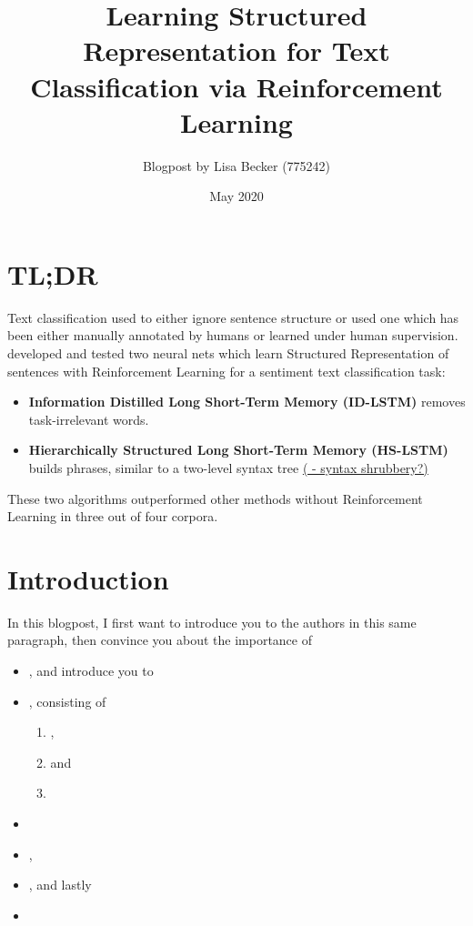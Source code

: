 \documentclass{article}
\title{Learning Structured Representation for Text Classification via Reinforcement Learning}
\author{Blogpost by Lisa Becker (775242) }
\date{May 2020}
\begin{document}
\maketitle

\section{TL;DR}
Text classification used to either ignore sentence structure or used one which has been either manually annotated by humans or learned under human supervision. \cite{zhang2018} developed and tested two neural nets which learn Structured Representation of sentences with Reinforcement Learning for a sentiment text classification task:
\begin{itemize}
    \item \textbf{Information Distilled Long Short-Term Memory (ID-LSTM)} removes task-irrelevant words.
    \item \textbf{Hierarchically Structured Long Short-Term Memory (HS-LSTM)} builds phrases, similar to a two-level syntax tree \href{https://www.youtube.com/watch?v=69iB-xy0u4A}{( - syntax shrubbery?)}
\end{itemize}
These two algorithms outperformed other methods without Reinforcement Learning in three out of four corpora.
\section{Introduction}
In this blogpost, I first want to introduce you to the authors in this same paragraph, then convince you about the importance of
\begin{itemize}
    \item {}, and introduce you to
    \item {}, consisting of
    \begin{enumerate}
        \item \textbf{},
        \item \textbf{} and
        \item \textbf{}
    \end{enumerate}
    \item {}
    \item {},
    \item {}, and lastly
    \item {}
\end{itemize}
\end{document}
